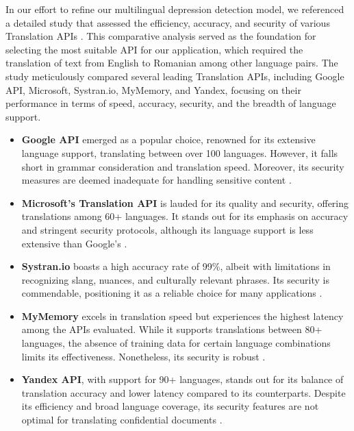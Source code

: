 \quad In our effort to refine our multilingual depression detection model, we referenced a detailed study that assessed the efficiency, accuracy, and security of various Translation APIs \cite{rashmi2020comparison}. This comparative analysis served as the foundation for selecting the most suitable API for our application, which required the translation of text from English to Romanian among other language pairs. The study meticulously compared several leading Translation APIs, including Google API, Microsoft, Systran.io, MyMemory, and Yandex, focusing on their performance in terms of speed, accuracy, security, and the breadth of language support.
\begin{itemize}
\item \textbf{Google API} emerged as a popular choice, renowned for its extensive language support, translating between over 100 languages. However, it falls short in grammar consideration and translation speed. Moreover, its security measures are deemed inadequate for handling sensitive content \cite{rashmi2020comparison}.

\item \textbf{Microsoft's Translation API} is lauded for its quality and security, offering translations among 60+ languages. It stands out for its emphasis on accuracy and stringent security protocols, although its language support is less extensive than Google's \cite{rashmi2020comparison}.

\item \textbf{Systran.io} boasts a high accuracy rate of 99\%, albeit with limitations in recognizing slang, nuances, and culturally relevant phrases. Its security is commendable, positioning it as a reliable choice for many applications \cite{rashmi2020comparison}.

\item \textbf{MyMemory} excels in translation speed but experiences the highest latency among the APIs evaluated. While it supports translations between 80+ languages, the absence of training data for certain language combinations limits its effectiveness. Nonetheless, its security is robust \cite{rashmi2020comparison}.

\item \textbf{Yandex API}, with support for 90+ languages, stands out for its balance of translation accuracy and lower latency compared to its counterparts. Despite its efficiency and broad language coverage, its security features are not optimal for translating confidential documents \cite{rashmi2020comparison}.
\end{itemize}

